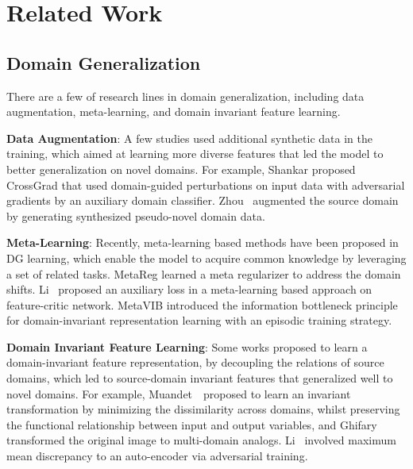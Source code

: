 \section{Related Work}
\subsection{Domain Generalization}
There are a few of research lines in domain generalization, including data augmentation, meta-learning, and domain invariant feature learning.

\textbf{Data Augmentation}: A few studies used additional synthetic data in the training, which aimed at learning more diverse features that led the model to better generalization on novel domains. For example, Shankar \etal \citep{shankar2018generalizing} proposed CrossGrad that used domain-guided perturbations on input data  with adversarial gradients by an auxiliary domain classifier. Zhou \etal \citep{zhou2020learning}~augmented the source domain by generating synthesized pseudo-novel domain data.

\textbf{Meta-Learning}: Recently, meta-learning based methods have been proposed in DG learning, which enable the model to acquire common knowledge by leveraging a set of related tasks. MetaReg \citep{balaji2018metareg} learned a meta regularizer to address the domain shifts. Li \etal \citep{li2019feature}~proposed an auxiliary loss in a meta-learning based approach on feature-critic network. MetaVIB \citep{du2020learning} introduced the information bottleneck principle for domain-invariant representation learning with an episodic training strategy.

\textbf{Domain Invariant Feature Learning}: Some works proposed to learn a domain-invariant feature representation, by decoupling the relations of source domains, which led to source-domain invariant features that generalized well to novel domains. For example, Muandet~\etal \citep{muandet2013domain}~proposed to learn an invariant transformation by minimizing the dissimilarity across domains, whilst preserving the functional relationship between input and output variables, and Ghifary \etal \citep{ghifary2015domain} transformed the original image to multi-domain analogs. Li~\etal \citep{li2018domain} involved maximum mean discrepancy to an auto-encoder via adversarial training.

